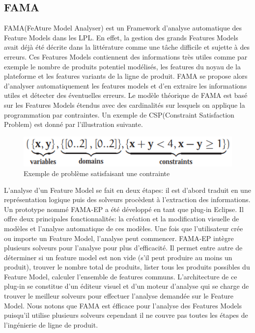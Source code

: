 \subsection{FAMA}
FAMA(FeAture Model Analyser) \cite{Benavodes2007} est un Framework d’analyse automatique des Feature Models dans les LPL. En effet, la gestion des grands Features Models avait déjà été décrite dans la littérature comme une tâche difficile et sujette à des erreurs. Ces Features Models contiennent des informations très utiles comme par exemple le nombre de produits potentiel modélisés, les features du noyau de la plateforme et les features variants de la ligne de produit. FAMA se propose alors d'analyser automatiquement les features models et d'en extraire les informations utiles et détecter des éventuelles erreurs. Le modèle théorique de FAMA est basé sur les Features Models étendus avec des cardinalités sur lesquels on applique la programmation par contraintes. Un exemple de CSP(Constraint Satisfaction Problem) est donné par l'illustration suivante.
\begin{figure}[h!]
  \includegraphics[scale=0.9999, width=150mm]{images/exemple_constraint_satisfaction_problem.PNG}
  \caption{Exemple de problème satisfaisant une contrainte \cite{Benavodes2007}}
  \label{fig:FORM_Process}
\end{figure}

L'analyse d'un Feature Model se fait en deux étapes: il est d'abord traduit en une représentation logique puis des solveurs procèdent à l'extraction des informations. Un prototype nommé FAMA-EP a été développé en tant que plug-in Eclipse. Il offre deux principales fonctionnalités: la création et la modification visuelle de modèles et l'analyse automatique de ces modèles. Une fois que l'utilisateur crée ou importe un Feature Model, l'analyse peut commencer. FAMA-EP intègre plusieurs solveurs pour l'analyse pour plus d'efficacité. Il permet entre autre de déterminer si un feature model est non vide (s'il peut produire au moins un produit), trouver le nombre total de produits, lister tous les produits possibles du Feature Model, calculer l'ensemble de features communs. 
L'architecture de ce plug-in se constitue d'un éditeur visuel et d'un moteur d'analyse qui se charge de trouver le meilleur solveurs pour effectuer l'analyse demandée sur le Feature Model. Nous notons que FAMA est éfficace pour l'analyse des Features Models puisqu'il utilise plusieurs solveurs cependant il ne couvre pas toutes les étapes de l'ingénierie de ligne de produit.
 
